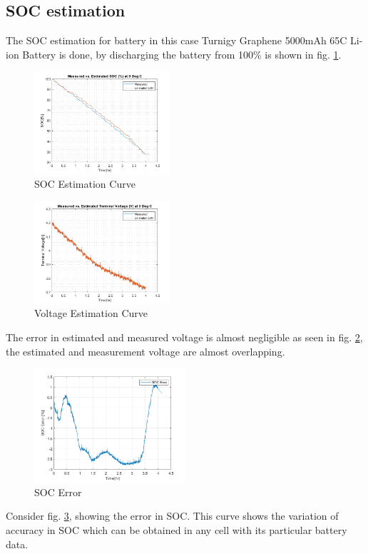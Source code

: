 \documentclass[conference]{IEEEtran}
\begin{document}
\subsection{SOC estimation}
\hspace{0.5cm}The SOC estimation for battery in this case Turnigy Graphene 5000mAh 65C Li-ion Battery is done, by discharging the battery from 100\% is shown in fig. \ref{soc_estimation_curve}.
\begin{figure}[htbp]
    \centering
    \includegraphics[width=0.45\textwidth]{images/soc_estimation_curve.png}
    \caption{SOC Estimation Curve}
    \label{soc_estimation_curve}
\end{figure}
\begin{figure}[htbp]
    \centering
    \includegraphics[width=0.45\textwidth]{images/voltage_estimation_curve.png}
    \caption{Voltage Estimation Curve}
    \label{voltage_estimation_curve}
\end{figure}
\newline 
\hspace{0.5cm}The error in estimated and measured voltage is almost negligible as seen in fig. \ref{voltage_estimation_curve}, the estimated and measurement voltage are almost overlapping.
\begin{figure}[htbp]
    \centering
    \includegraphics[width=0.5\textwidth]{images/soc_error.png}
    \caption{SOC Error}
    \label{soc_error}
\end{figure}
\newline
\hspace{0.5cm}Consider fig. \ref{soc_error}, showing the error in SOC. This curve shows the variation of accuracy in SOC which can be obtained in any cell with its particular battery data.
\end{document}
